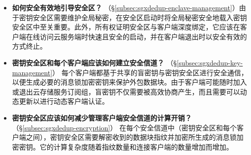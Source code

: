 \begin{itemize}
  \item \textbf{如何安全有效地引导安全区？} （\S\ref{subsec:sgxdedup-enclave-management}）由于密钥安全区需要维护全局秘密，在安全区启动时将全局秘密安全地载入密钥安全区中至关重要。此外，所有权证明安全区与客户端深度绑定，它应该在客户端在线访问云服务端时快速且安全的启动，并在客户端退出时以安全有效的方式终止。
  \item \textbf{密钥安全区和每个客户端应该如何建立安全信道？} （\S\ref{subsec:sgxdedup-key-management}）
  每个客户端都基于共享的盲密钥与密钥安全区进行安全通信，以便生成必要的消息锁加密密钥来保护外包数据块。由于客户端可能随时加入或退出云存储服务订阅组，盲密钥不仅需要被高效协商产生，而且需要可以动态更新以进行动态客户端认证。
  \item \textbf{密钥安全区应该如何减少管理客户端安全信道的计算开销？} （\S\ref{subsec:sgxdedup-encryption}）
  在每个安全信道中（密钥安全区和每个客户端之间），密钥安全区需要解密收到的数据块指纹并加密所生成的消息锁加密密钥。它的计算复杂度随着指纹数量和连接客户端的数量增加而增加。
\end{itemize}
